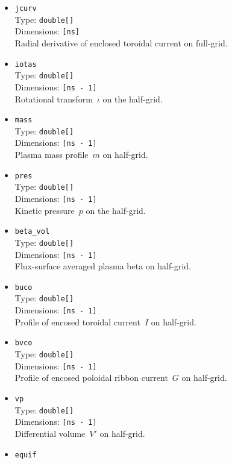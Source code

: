 \begin{itemize}
 \item \texttt{jcurv} \\
       Type: \texttt{double[]} \\
       Dimensions: \texttt{[ns]} \\
       Radial derivative of enclosed toroidal current on full-grid.
 \item \texttt{iotas} \\
       Type: \texttt{double[]} \\
       Dimensions: \texttt{[ns - 1]} \\
       Rotational transform~$\iota$ on the half-grid.
 \item \texttt{mass} \\
       Type: \texttt{double[]} \\
       Dimensions: \texttt{[ns - 1]} \\
       Plasma mass profile~$m$ on half-grid.
 \item \texttt{pres} \\
       Type: \texttt{double[]} \\
       Dimensions: \texttt{[ns - 1]} \\
       Kinetic pressure~$p$ on the half-grid.
 \item \texttt{beta\_vol} \\
       Type: \texttt{double[]} \\
       Dimensions: \texttt{[ns - 1]} \\
       Flux-surface averaged plasma beta on half-grid.
 \item \texttt{buco} \\
       Type: \texttt{double[]} \\
       Dimensions: \texttt{[ns - 1]} \\
       Profile of encosed toroidal current~$I$ on half-grid.
 \item \texttt{bvco} \\
       Type: \texttt{double[]} \\
       Dimensions: \texttt{[ns - 1]} \\
       Profile of encosed poloidal ribbon current~$G$ on half-grid.
 \item \texttt{vp} \\
       Type: \texttt{double[]} \\
       Dimensions: \texttt{[ns - 1]} \\
       Differential volume~$V'$ on half-grid.
 \item \texttt{equif} \\

\end{itemize}
